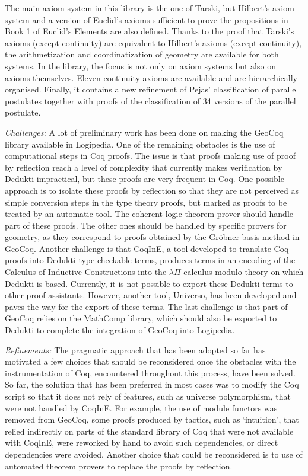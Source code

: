 The main axiom system in this library is the one of Tarski, but
Hilbert's axiom system and a version of Euclid's axioms sufficient to
prove the propositions in Book 1 of Euclid's Elements are also
defined. Thanks to the proof that Tarski's axioms (except continuity)
are equivalent to Hilbert's axioms (except continuity), the
arithmetization and coordinatization of geometry are available for
both systems. In the library, the focus is not only on axiom systems
but also on axioms themselves. Eleven continuity axioms are available
and are hierarchically organised. Finally, it contains a new
refinement of Pejas' classification of parallel postulates together
with proofs of the classification of 34 versions of the parallel
postulate.

\emph{Challenges:} A lot of preliminary work has been done on making the
GeoCoq library available in Logipedia.  One of the remaining obstacles is the use of
computational steps in Coq proofs. The issue is that proofs making use of
proof by reflection reach a level of complexity that currently makes
verification by Dedukti impractical, but these proofs are very
frequent in Coq.  One possible approach is to isolate these proofs by
reflection so that they are not perceived as simple conversion steps
in the type theory proofs, but marked as proofs to be treated by an
automatic tool. The coherent logic theorem prover should handle part
of these proofs. The other ones should be handled by specific provers
for geometry, as they correspond to proofs obtained by the Gr\"obner
basis method in GeoCoq.  Another challenge is that CoqInE, a tool
developed to translate Coq proofs into Dedukti type-checkable terms,
produces terms in an encoding of the Calculus of Inductive
Constructions into the $\lambda \Pi$-calculus modulo theory on which
Dedukti is based. Currently, it is not possible to export these
Dedukti terms to other proof assistants. However, another tool,
Universo, has been developed and paves the way for the export of these
terms.  The last challenge is that part of GeoCoq relies on the
MathComp library, which should also be exported to Dedukti to complete
the integration of GeoCoq into Logipedia.

\emph{Refinements:}
The pragmatic approach that has been adopted so far has motivated a
few choices that should be reconsidered once the obstacles with the instrumentation of Coq,
encountered throughout this process, have been solved. So far, the solution that
has been preferred in most cases was to modify the Coq script so that
it does not rely of features, such as universe polymorphism, that were
not handled by CoqInE. For
example, the use of module functors was removed from GeoCoq, some
proofs produced by tactics, such as `intuition', that relied indirectly on
parts of the standard library of Coq that were not available with
CoqInE, were reworked by hand to avoid such dependencies, or direct
dependencies were avoided. Another choice that could be reconsidered
is to use of automated theorem provers to replace the proofs by reflection.

